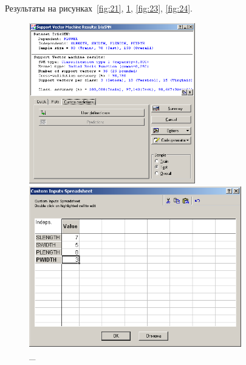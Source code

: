 Результаты на рисунках~\ref{fig:21}, \ref{fig:22}, \ref{fig:23}, \ref{fig:24}.

\begin{figure}[!h]
  \centering

  \begin{minipage}{0.49\textwidth}
    \centering

    \includegraphics[height=7cm]
    {inc/ex_21.PNG}

    \caption{\_}

    \label{fig:21}
  \end{minipage}
  \begin{minipage}{0.49\textwidth}
    \centering

    \includegraphics[height=7cm]
    {inc/ex_22.PNG}

    \caption{\_}

    \label{fig:22}
  \end{minipage}
\end{figure}

